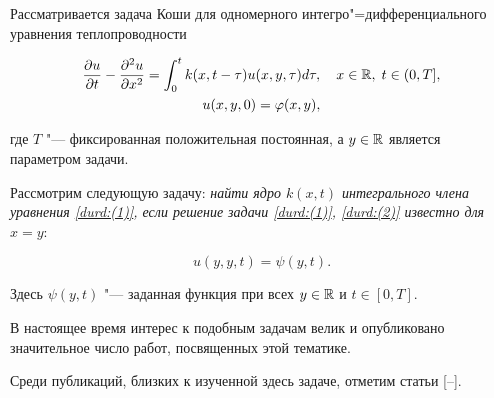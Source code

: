 








Рассматривается задача Коши  для одномерного интегро"=дифференциального уравнения теплопроводности

\begin{gather}

 \frac{\partial u}{\partial t} - \frac{\partial^2 u }{\partial x^2}=\int_{0}^{t}k(x,

 t-\tau)u(x,y,\tau)d\tau, \quad  x\in {\Bbb R}, \; t\in (0, T], 

 \label{durd:(1)}

\\

u(x,y, 0)=\varphi(x,y), 

 \label{durd:(2)}

\end{gather}

где  $T$ "--- фиксированная положительная постоянная, а  $y\in {\Bbb R}$ является параметром задачи.



Рассмотрим следующую  задачу: \it  найти ядро $k(x,t)$ интегрального члена уравнения \rm \eqref{durd:(1)}, \it если  решение задачи \rm \eqref{durd:(1)}, \eqref{durd:(2)} \rm известно для $x=y{:}$ 

\begin{equation}

 \label{durd:(3)}

 u(y,y,t)=\psi(y,t).

\end{equation}

Здесь $\psi(y,t)$ "--- заданная функция при всех  $y\in {\Bbb R}$ и $t\in [0, T].$ \rm





В настоящее время интерес к подобным задачам велик и опубликовано значительное число работ, посвященных этой тематике.  

Среди публикаций,  близких к изученной здесь задаче, отметим статьи [--]. 

